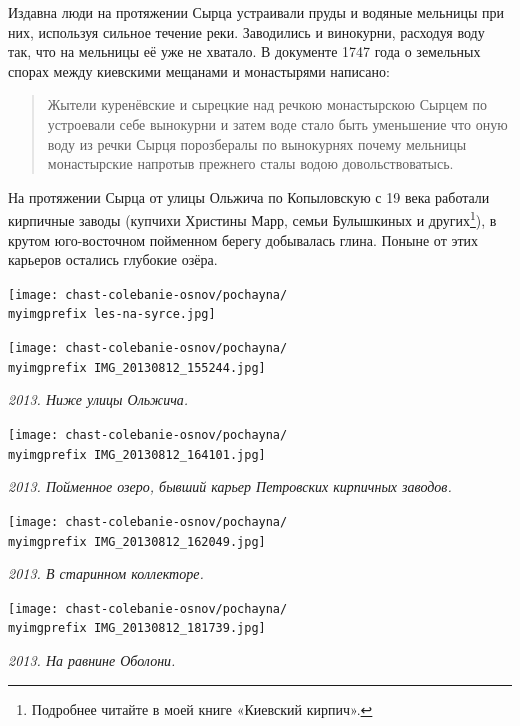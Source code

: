 Издавна люди на протяжении Сырца устраивали пруды и водяные мельницы при них, используя сильное течение реки. Заводились и винокурни, расходуя воду так, что на мельницы её уже не хватало. В документе 1747 года\cite[вып. 6, стр. 57]{histmatkiev} о земельных спорах между киевскими мещанами и монастырями написано:

\begin{quotation}
Жытели куренёвские и сырецкие над речкою монастырскою Сырцем по устроевали себе вынокурни и затем воде стало быть уменьшение что оную воду из речки Сырця порозбералы по вынокурнях почему мельницы монастырские напротыв прежнего сталы водою довольствоватысь.
\end{quotation}

На протяжении Сырца от улицы Ольжича по Копыловскую с 19 века работали кирпичные заводы (купчихи Христины Марр, семьи Булышкиных и других\footnote{Подробнее читайте в моей книге «Киевский кирпич».}), в крутом юго-восточном пойменном берегу добывалась глина. Поныне от этих карьеров остались глубокие озёра.

\begin{center}
\texttt{[image: chast-colebanie-osnov/pochayna/\\myimgprefix les-na-syrce.jpg]}
\end{center}

\newpage

\begin{center}
\texttt{[image: chast-colebanie-osnov/pochayna/\\myimgprefix IMG\_20130812\_155244.jpg]}
\end{center}

\textit{2013. Ниже улицы Ольжича.}

\begin{center}
\texttt{[image: chast-colebanie-osnov/pochayna/\\myimgprefix IMG\_20130812\_164101.jpg]}

\textit{2013. Пойменное озеро, бывший карьер Петровских кирпичных заводов.}
\end{center}

\newpage

\begin{center}
\texttt{[image: chast-colebanie-osnov/pochayna/\\myimgprefix IMG\_20130812\_162049.jpg]}

\textit{2013. В старинном коллекторе.}
\end{center}

\begin{center}
\texttt{[image: chast-colebanie-osnov/pochayna/\\myimgprefix IMG\_20130812\_181739.jpg]}

\textit{2013. На равнине Оболони.}
\end{center}

